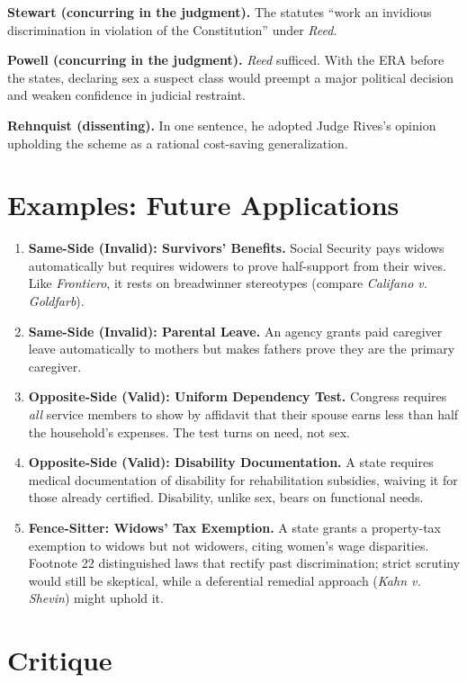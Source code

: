 \documentclass[12pt]{article}
\begin{document}
\textbf{Stewart (concurring in the judgment).} The statutes ``work an invidious discrimination in violation of the Constitution'' under \textit{Reed}.

\textbf{Powell (concurring in the judgment).} \textit{Reed} sufficed. With the ERA before the states, declaring sex a suspect class would preempt a major political decision and weaken confidence in judicial restraint.

\textbf{Rehnquist (dissenting).} In one sentence, he adopted Judge Rives's opinion upholding the scheme as a rational cost-saving generalization.

\section{Examples: Future Applications}

\begin{enumerate}
\item \textbf{Same-Side (Invalid): Survivors' Benefits.} Social Security pays widows automatically but requires widowers to prove half-support from their wives. Like \textit{Frontiero}, it rests on breadwinner stereotypes (compare \textit{Califano v. Goldfarb}).
\item \textbf{Same-Side (Invalid): Parental Leave.} An agency grants paid caregiver leave automatically to mothers but makes fathers prove they are the primary caregiver.
\item \textbf{Opposite-Side (Valid): Uniform Dependency Test.} Congress requires \emph{all} service members to show by affidavit that their spouse earns less than half the household's expenses. The test turns on need, not sex.
\item \textbf{Opposite-Side (Valid): Disability Documentation.} A state requires medical documentation of disability for rehabilitation subsidies, waiving it for those already certified. Disability, unlike sex, bears on functional needs.
\item \textbf{Fence-Sitter: Widows' Tax Exemption.} A state grants a property-tax exemption to widows but not widowers, citing women's wage disparities. Footnote 22 distinguished laws that rectify past discrimination; strict scrutiny would still be skeptical, while a deferential remedial approach (\textit{Kahn v. Shevin}) might uphold it.
\end{enumerate}

\section{Critique}
\end{document}
